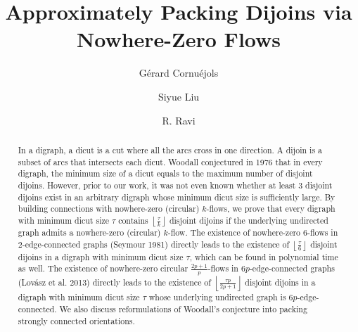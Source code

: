 \documentclass[runningheads]{llncs}
\newcommand{\rounddown}[1]{\left\lfloor#1\right\rfloor}
\begin{document}
\title{Approximately Packing Dijoins via Nowhere-Zero Flows}
\author{Gérard Cornuéjols \and
Siyue Liu \and
R. Ravi}

\maketitle              


\begin{abstract}
In a digraph, a dicut is a cut where all the arcs cross in one direction. A dijoin is a subset of arcs that intersects each dicut. Woodall conjectured in 1976 that in every digraph, the minimum size of a dicut equals to the maximum number of disjoint dijoins. However, prior to our work, it was not even known whether at least $3$ disjoint dijoins exist in an arbitrary digraph whose minimum dicut size is sufficiently large. By building connections with nowhere-zero (circular) $k$-flows, we prove that every digraph with minimum dicut size $\tau$ contains $\rounddown{\frac{\tau}{k}}$ disjoint dijoins if the underlying undirected graph admits a nowhere-zero (circular) $k$-flow. The existence of nowhere-zero $6$-flows in $2$-edge-connected graphs (Seymour 1981) directly leads to the existence of $\rounddown{\frac{\tau}{6}}$ disjoint dijoins in a digraph with minimum dicut size $\tau$, which can be found in polynomial time as well. The existence of nowhere-zero circular $\frac{2p+1}{p}$-flows in $6p$-edge-connected graphs (Lov\'asz et al. 2013) directly leads to the existence of $\rounddown{\frac{\tau p}{2p+1}}$ disjoint dijoins in a digraph with minimum dicut size $\tau$ whose underlying undirected graph is $6p$-edge-connected.
We also discuss reformulations of Woodall's conjecture into packing strongly connected orientations.
\end{abstract}
\end{document}
